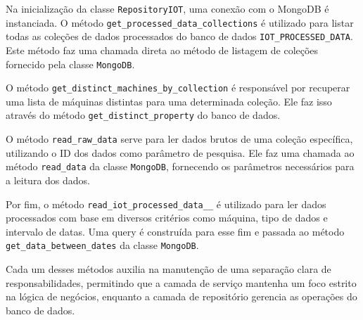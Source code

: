 Na inicialização da classe \texttt{RepositoryIOT}, uma conexão com o MongoDB é instanciada. O método \texttt{get\_processed\_data\_collections} é utilizado para listar todas as coleções de dados processados do banco de dados \texttt{IOT\_PROCESSED\_DATA}. Este método faz uma chamada direta ao método de listagem de coleções fornecido pela classe \texttt{MongoDB}.

O método \texttt{get\_distinct\_machines\_by\_collection} é responsável por recuperar uma lista de máquinas distintas para uma determinada coleção. Ele faz isso através do método \texttt{get\_distinct\_property} do banco de dados.

O método \texttt{read\_raw\_data} serve para ler dados brutos de uma coleção específica, utilizando o ID dos dados como parâmetro de pesquisa. Ele faz uma chamada ao método \texttt{read\_data} da classe \texttt{MongoDB}, fornecendo os parâmetros necessários para a leitura dos dados.

Por fim, o método \texttt{read\_iot\_processed\_data\_\_} é utilizado para ler dados processados com base em diversos critérios como máquina, tipo de dados e intervalo de datas. Uma query é construída para esse fim e passada ao método \texttt{get\_data\_between\_dates} da classe \texttt{MongoDB}.

Cada um desses métodos auxilia na manutenção de uma separação clara de responsabilidades, permitindo que a camada de serviço mantenha um foco estrito na lógica de negócios, enquanto a camada de repositório gerencia as operações do banco de dados.



